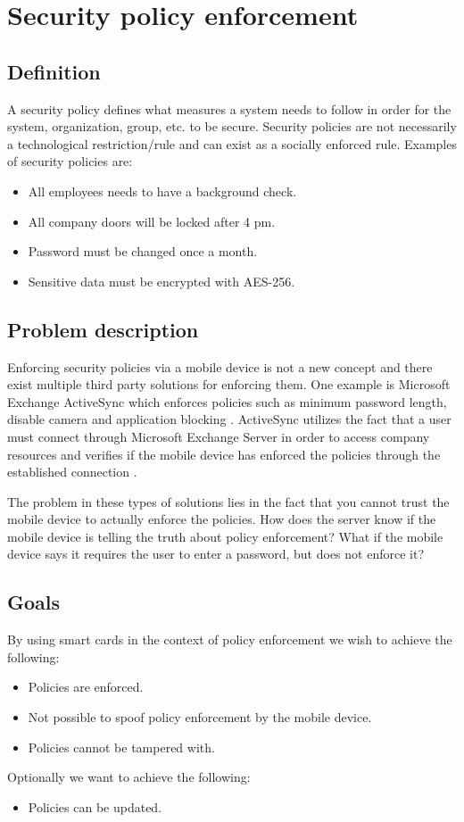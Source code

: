 \section{Security policy enforcement}
\label{sec:policies}

\subsection{Definition}
A security policy defines what measures a system needs to follow in order for the system, organization, group, etc. to be secure. Security policies are not necessarily a technological restriction/rule and can exist as a socially enforced rule. Examples of security policies are:
\begin{itemize}
  \item All employees needs to have a background check.
  \item All company doors will be locked after 4 pm.
  \item Password must be changed once a month.
  \item Sensitive data must be encrypted with AES-256.
\end{itemize}

\subsection{Problem description}
Enforcing security policies via a mobile device is not a new concept and there exist multiple third party solutions for enforcing them. One example is Microsoft Exchange ActiveSync which enforces policies such as minimum password length, disable camera and application blocking \cite{exchangePolicies, msExchangeCookBook}. ActiveSync utilizes the fact that a user must connect through Microsoft Exchange Server in order to access company resources and verifies if the mobile device has enforced the policies through the established connection \cite{exchangePoliciesTech}.

The problem in these types of solutions lies in the fact that you cannot trust the mobile device to actually enforce the policies. How does the server know if the mobile device is telling the truth about policy enforcement? What if the mobile device says it requires the user to enter a password, but does not enforce it?

\subsection{Goals}
By using smart cards in the context of policy enforcement we wish to achieve the following:
\begin{itemize}
  \item Policies are enforced.
  \item Not possible to spoof policy enforcement by the mobile device.
  \item Policies cannot be tampered with.
\end{itemize}
Optionally we want to achieve the following:
\begin{itemize}
  \item Policies can be updated.
\end{itemize}

